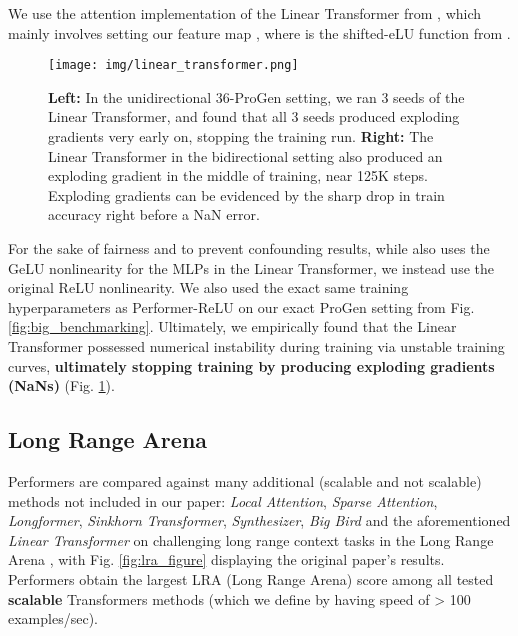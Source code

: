 We use the attention implementation of the Linear Transformer from \citep{trans-rnns}, which mainly involves setting our feature map , where  is the shifted-eLU function from \citep{elu}. 

\begin{figure}[h]
  \centering
  \texttt{[image: img/linear\_transformer.png]}
  \caption{\textbf{Left:} In the unidirectional 36-ProGen setting, we ran 3 seeds of the Linear Transformer, and found that all 3 seeds produced exploding gradients very early on, stopping the training run. \textbf{Right:} The Linear Transformer in the bidirectional setting also produced an exploding gradient in the middle of training, near 125K steps. Exploding gradients can be evidenced by the sharp drop in train accuracy right before a NaN error.}
  \label{fig:linear_transformer}
\end{figure}

For the sake of fairness and to prevent confounding results, while \citep{trans-rnns} also uses the GeLU nonlinearity for the MLPs in the Linear Transformer, we instead use the original ReLU nonlinearity. We also used the exact same training hyperparameters as Performer-ReLU on our exact ProGen setting from Fig. \ref{fig:big_benchmarking}. Ultimately, we empirically found that the Linear Transformer possessed numerical instability during training via unstable training curves, \textbf{ultimately stopping training by producing exploding gradients (NaNs)} (Fig. \ref{fig:linear_transformer}).

\subsection{Long Range Arena}
Performers are compared against many additional (scalable and not scalable) methods not included in our paper: \textit{Local Attention}, \textit{Sparse Attention}, \textit{Longformer}, \textit{Sinkhorn Transformer}, \textit{Synthesizer}, \textit{Big Bird} and the aforementioned \textit{Linear Transformer} on challenging long range context tasks in the Long Range Arena \citep{lra}, with Fig. \ref{fig:lra_figure} displaying the original paper's results. Performers obtain the largest LRA (Long Range Arena) score among all tested \textbf{scalable} Transformers methods (which we define by having speed of > 100 examples/sec). 

